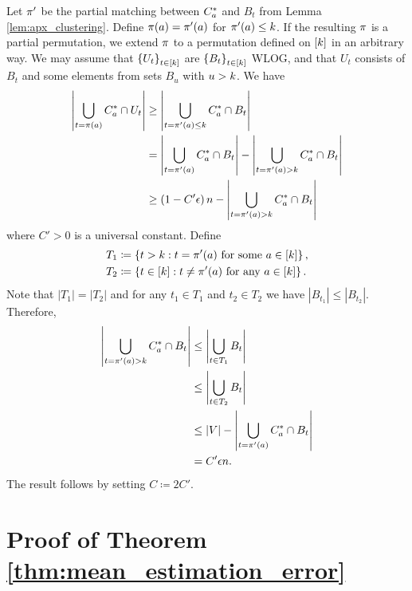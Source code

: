 Let $\pi'$ be the partial matching between $C_{a}^{*}$ and $B_{t}$
from Lemma \ref{lem:apx_clustering}. Define $\pi(a)=\pi'(a)$
for $\pi'(a)\le k$. If the resulting $\pi$ is a partial
permutation, we extend $\pi$ to a permutation defined on $\left[k\right]$
in an arbitrary way. We may assume that $\left\{ U_{t}\right\} _{t\in\left[k\right]}$
are $\left\{ B_{t}\right\} _{t\in\left[k\right]}$ WLOG, and
that $U_{t}$ consists of $B_{t}$ and some elements from sets $B_{u}$
with $u>k$. We have 
\begin{align*}
\left|\bigcup_{t=\pi(a)}C_{a}^{*}\cap U_{t}\right| & \ge\left|\bigcup_{t=\pi'(a)\le k}C_{a}^{*}\cap B_{t}\right|\\
 & =\left|\bigcup_{t=\pi'(a)}C_{a}^{*}\cap B_{t}\right|-\left|\bigcup_{t=\pi'(a)>k}C_{a}^{*}\cap B_{t}\right|\\
 & \ge\left(1-C'\epsilon\right)n-\left|\bigcup_{t=\pi'(a)>k}C_{a}^{*}\cap B_{t}\right|
\end{align*}
where $C'>0$ is a universal constant. Define 
\begin{align*}
T_{1} & \coloneqq\left\{ t>k:t=\pi'(a)\text{ for some }a\in\left[k\right]\right\} ,\\
T_{2} & \coloneqq\left\{ t\in\left[k\right]:t\ne\pi'(a)\text{ for any }a\in\left[k\right]\right\} .
\end{align*}
Note that $\left|T_{1}\right|=\left|T_{2}\right|$ and for any $t_{1}\in T_{1}$
and $t_{2}\in T_{2}$ we have $\left|B_{t_{1}}\right|\le\left|B_{t_{2}}\right|$.
Therefore, 
\begin{align*}
\left|\bigcup_{t=\pi'(a)>k}C_{a}^{*}\cap B_{t}\right| & \le\left|\bigcup_{t\in T_{1}}B_{t}\right|\\
 & \le\left|\bigcup_{t\in T_{2}}B_{t}\right|\\
 & \le\left|V\right|-\left|\bigcup_{t=\pi'(a)}C_{a}^{*}\cap B_{t}\right|\\
 & =C'\epsilon n.
\end{align*}
The result follows by setting $C\coloneqq2C'$.

\section{Proof of Theorem \ref{thm:mean_estimation_error}\label{sec:proof_mean_estimation_error}}

